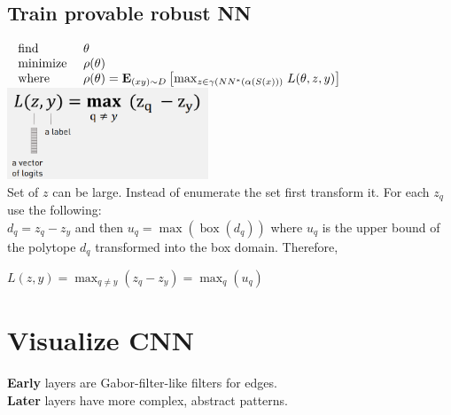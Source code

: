 \documentclass[11pt]{extarticle}
\begin{document}
\begin{multicols*}{3}
		\subsection{Train provable robust NN}
		$\begin{array} { l l } { \text { find } } & { \theta } \\ { \text { minimize } } & { \rho ( \theta ) } \\ { \text { where } } & { \rho ( \theta ) = \mathbf { E } _ { ( x y ) \sim D } \left[ \max _ { z \in \gamma \left( N N ^ { * } ( \alpha ( S ( x ) ) ) \right. } L ( \theta , z , y ) \right] } \end{array}$\\
		\includegraphics[width=6cm]{Loss_abstract.png}\\
		Set of $z$ can be large. Instead of enumerate the set first transform it. For each $z_q$ use the following: \\
		$d_q = z_q - z_y$ and then $u_q = \max \left( \operatorname { box } \left( d _ { q } \right) \right)$
		where $u_q$ is the upper bound of the polytope $d_q$ transformed into the box domain. Therefore,
		
		$L ( z , y ) = \max _ { q \neq y } \left( z _ { q } - z _ { y } \right) = \max _ { q} (u_q )$
		
		\section{Visualize CNN}
		    \textbf{Early} layers are Gabor-filter-like filters for edges.\\
		    \textbf{Later} layers have more complex, abstract patterns.\\

\end{multicols*}
\end{document}
